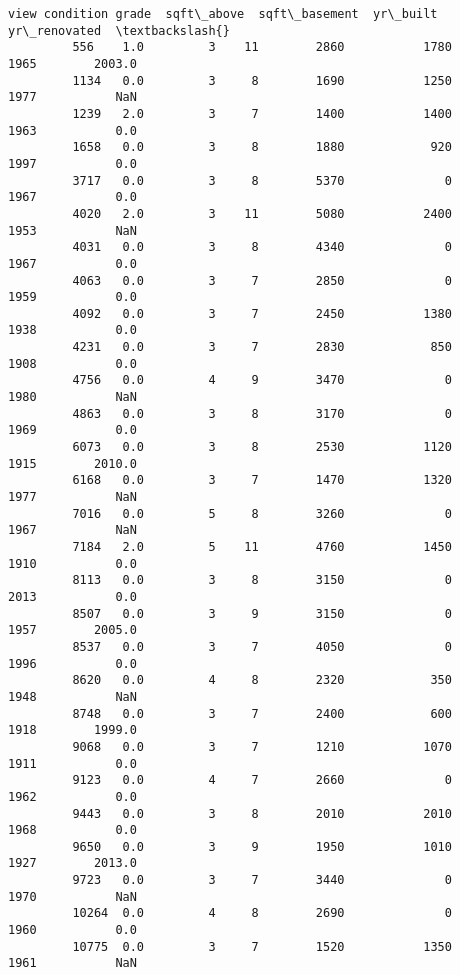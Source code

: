 \documentclass[11pt]{article}
\begin{document}
\begin{Verbatim}[commandchars=\\\{\}]
               view condition grade  sqft\_above  sqft\_basement  yr\_built  yr\_renovated  \textbackslash{}
         556    1.0         3    11        2860           1780      1965        2003.0   
         1134   0.0         3     8        1690           1250      1977           NaN   
         1239   2.0         3     7        1400           1400      1963           0.0   
         1658   0.0         3     8        1880            920      1997           0.0   
         3717   0.0         3     8        5370              0      1967           0.0   
         4020   2.0         3    11        5080           2400      1953           NaN   
         4031   0.0         3     8        4340              0      1967           0.0   
         4063   0.0         3     7        2850              0      1959           0.0   
         4092   0.0         3     7        2450           1380      1938           0.0   
         4231   0.0         3     7        2830            850      1908           0.0   
         4756   0.0         4     9        3470              0      1980           NaN   
         4863   0.0         3     8        3170              0      1969           0.0   
         6073   0.0         3     8        2530           1120      1915        2010.0   
         6168   0.0         3     7        1470           1320      1977           NaN   
         7016   0.0         5     8        3260              0      1967           NaN   
         7184   2.0         5    11        4760           1450      1910           0.0   
         8113   0.0         3     8        3150              0      2013           0.0   
         8507   0.0         3     9        3150              0      1957        2005.0   
         8537   0.0         3     7        4050              0      1996           0.0   
         8620   0.0         4     8        2320            350      1948           NaN   
         8748   0.0         3     7        2400            600      1918        1999.0   
         9068   0.0         3     7        1210           1070      1911           0.0   
         9123   0.0         4     7        2660              0      1962           0.0   
         9443   0.0         3     8        2010           2010      1968           0.0   
         9650   0.0         3     9        1950           1010      1927        2013.0   
         9723   0.0         3     7        3440              0      1970           NaN   
         10264  0.0         4     8        2690              0      1960           0.0   
         10775  0.0         3     7        1520           1350      1961           NaN   

\end{Verbatim}
\end{document}
